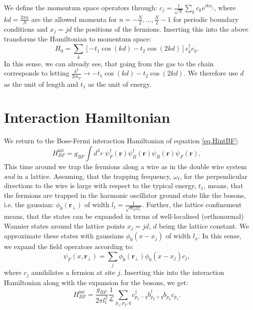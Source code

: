 We define the momentum space operators through: $c_j = \frac{1}{\sqrt{N}}\sum_{k} c_k \text{e}^{ikx_j}$, where $kd = \frac{2\pi n}{N}$ are the allowed momenta for $n = -\frac{N}{2}, \dots, \frac{N}{2} - 1$ for periodic boundary conditions and $x_j = jd$ the positions of the fermions. Inserting this into the above transforms the Hamiltonian to momentum space:
\begin{equation}
H_{0} = \sum_k \left[ - t_1\cos(kd) - t_2\cos(2kd)\right]c^\dagger_kc_k.
\label{eq.Htightbindingmomentumspace} 
\end{equation}
In this sense, we can already see, that going from the gas to the chain corresponds to letting $\frac{k^2}{2m_F} \to - t_1\cos(kd) - t_2\cos(2kd)$. We therefore use $d$ as the unit of length and $t_1$ as the unit of energy. 


\section{Interaction Hamiltonian} \label{sec.interaction.lattice}
We return to the Bose-Fermi interaction Hamiltonian of equation \eqref{eq.HintBF}:
\begin{equation}
H_{BF}^\text{int} = g_{BF}\int d^3 r \; \psi_F^\dagger(\mathbf{r}) \psi_B^\dagger(\mathbf{r})\psi_B(\mathbf{r})\psi_F(\mathbf{r}),
\end{equation} 
This time around we trap the fermions along a wire as in the double wire system \textit{and} in a lattice. Assuming, that the trapping frequency, $\omega_t$, for the perpendicular directions to the wire is large with respect to the typical energy, $t_1$, means, that the fermions are trapped in the harmonic oscillator ground state like the bosons, i.e. the gaussian: $\phi_0(\mathbf{r}_{\perp})$ of width $l_t = \frac{1}{\sqrt{m_F\omega_t}}$. Further, the lattice confinement means, that the states can be expanded in terms of well-localised (orthonormal) Wannier states around the lattice points $x_j = jd$, $d$ being the lattice constant. We approximate these states with gaussians $\phi_0(x - x_j)$ of width $l_x$. In this sense, we expand the field operators according to:
\begin{equation}
\psi_F(x, \mathbf{r}_{\perp}) = \sum_j \phi_0(\mathbf{r}_{\perp})\phi_0(x - x_j) c_j, 
\end{equation}
where $c_j$ annihilates a fermion at site $j$. Inserting this into the interaction Hamiltonian along with the expansion for the bosons, we get:
\begin{equation}
H_{BF}^{\text{int}} = \frac{g_{BF}}{2\pi l_t^2}\frac{1}{\mathcal{L}}\sum_{p_1, p_2, q} c^\dagger_{p_1 - q}b^\dagger_{p_2 + q}b_{p_2}c_{p_1}. \nonumber
\end{equation}
